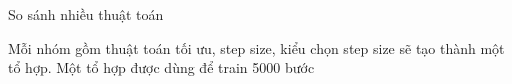 \documentclass[10pt]{beamer}
\theoremstyle{remark}
\theoremstyle{definition}
\begin{document}
\begin{frame}{So sánh nhiều thuật toán}
	\begin{figure}[!htp]
		\hfill
	  \end{figure}

	Mỗi nhóm gồm thuật toán tối ưu, step size, kiểu chọn step size sẽ tạo thành một tổ hợp.
	Một tổ hợp được dùng để train 5000 bước

\end{frame}
\end{document}
